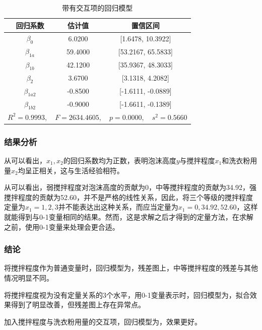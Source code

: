 \begin{table}[H]
    \centering
    \caption{带有交互项的回归模型}
    \label{tab:ex9_interact}
    \begin{tabular}{|c|c|c|}
        \hline
        回归系数 & 估计值 & 置信区间\\
        \hline
        \hline
        \(\beta_0\) & 6.0200 & [1.6478, 10.3922]\\
        \hline
        \(\beta_{1a}\) & 59.4000 & [53.2167, 65.5833]\\
        \hline
        \(\beta_{1b}\) & 42.1200 & [35.9367, 48.3033]\\
        \hline
        \(\beta_2\) & 3.6700 & [3.1318, 4.2082]\\
        \hline
        \(\beta_{1a2}\) & -0.8500 & [-1.6111, -0.0889]\\
        \hline
        \(\beta_{1b2}\) & -0.9000 & [-1.6611, -0.1389]\\
        \hline
        \multicolumn{3}{|c|}{$R^2=0.9993, \quad F=2634.4605, \quad p=0.0000, \quad s^2=0.5660$}\\
        \hline
    \end{tabular}
\end{table}

\subsubsection{结果分析}

从可以看出，$x_1,x_2$的回归系数均为正数，表明泡沫高度$y$与搅拌程度$x_1$和洗衣粉用量$x_2$均呈正相关，这与生活经验相符。

从可以看出，弱搅拌程度对泡沫高度的贡献为0，中等搅拌程度的贡献为34.92，强搅拌程度的贡献为52.60，并不是严格的线性关系，因此，将三个等级的搅拌程度定量为$x_1=1,2,3$并不能表达出这种关系，而应当定量为$x_1=0,34.92,52.60$，这样就能得到与0-1变量相同的结果。然而，这是求解之后才得到的定量方法，在求解之前，使用0-1变量来处理会更合适。

\subsubsection{结论}

将搅拌程度作为普通变量时，回归模型为，残差图上，中等搅拌程度的残差与其他情况明显不同。

将搅拌程度视为没有定量关系的3个水平，用0-1变量表示时，回归模型为，拟合效果得到了明显改善，但残差图上存在异常点。

加入搅拌程度与洗衣粉用量的交互项，回归模型为，效果更好。
